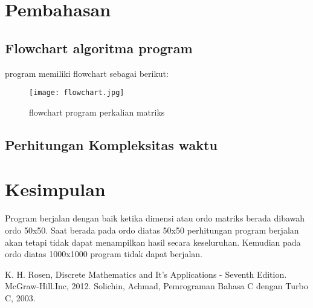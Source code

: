 \documentclass[conference]{IEEEtran}
\begin{document}
\begin{center}
\end{center}

\section{Pembahasan}

\subsection{Flowchart algoritma program}
program memiliki flowchart sebagai berikut:

\begin{figure}[htbp]
    \texttt{[image: flowchart.jpg]}
    \centering
    \caption{flowchart program perkalian matriks}        
\end{figure}


\subsection{Perhitungan Kompleksitas waktu}


\section{Kesimpulan}
Program berjalan dengan baik ketika dimensi atau ordo matriks berada dibawah ordo 50x50. Saat berada pada ordo diatas 50x50 perhitungan program berjalan akan tetapi tidak dapat menampilkan hasil secara keseluruhan. Kemudian pada ordo diatas 1000x1000 program tidak dapat berjalan.

\begin{thebibliography}{00}
     K. H. Rosen, Discrete Mathematics and It’s Applications - Seventh
    Edition. McGraw-Hill.Inc, 2012.
     Solichin, Achmad, Pemrograman Bahasa C dengan Turbo C, 2003.
    \end{thebibliography}
\end{document}
